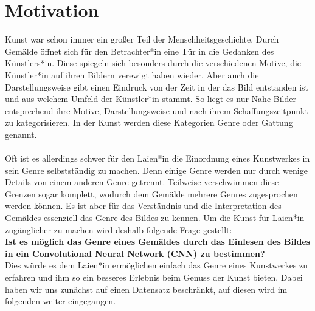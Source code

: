 \section{Motivation}
Kunst war schon immer ein großer Teil der Menschheitsgeschichte.
Durch Gemälde öffnet sich für den Betrachter*in eine Tür in die Gedanken des Künstlers*in.
Diese spiegeln sich besonders durch die verschiedenen Motive, die Künstler*in auf ihren Bildern verewigt haben wieder.
Aber auch die Darstellungsweise gibt einen Eindruck von der Zeit in der das Bild entstanden ist und aus welchem Umfeld der Künstler*in stammt.
So liegt es nur Nahe Bilder entsprechend ihre Motive, Darstellungsweise und nach ihrem Schaffungszeitpunkt zu kategorisieren.
In der Kunst werden diese Kategorien Genre oder Gattung genannt.
\\\\
Oft ist es allerdings schwer für den Laien*in die Einordnung eines Kunstwerkes in sein Genre selbstständig zu machen.
Denn einige Genre werden nur durch wenige Details von einem anderen Genre getrennt.
Teilweise verschwimmen diese Grenzen sogar komplett, wodurch dem Gemälde mehrere Genres zugesprochen werden können.
Es ist aber für das Verständnis und die Interpretation des Gemäldes essenziell das Genre des Bildes zu kennen.
Um die Kunst für Laien*in zugänglicher zu machen wird deshalb folgende Frage gestellt:
\\
\textbf{Ist es möglich das Genre eines Gemäldes durch das Einlesen des Bildes in ein Convolutional Neural Network (CNN) zu bestimmen?}
\\
Dies würde es dem Laien*in ermöglichen einfach das Genre eines Kunstwerkes zu erfahren und ihm so ein besseres Erlebnis beim Genuss der Kunst bieten.
Dabei haben wir uns zunächst auf einen Datensatz beschränkt, auf diesen wird im folgenden weiter eingegangen.
